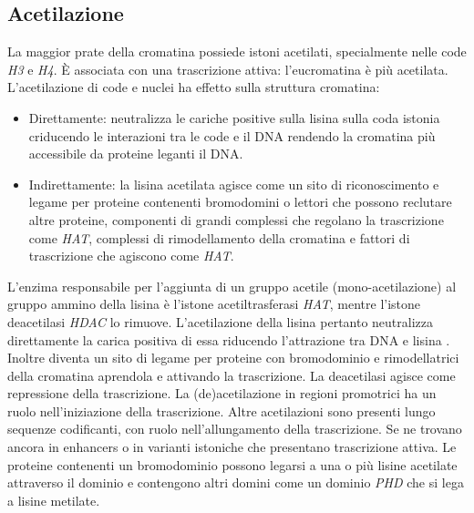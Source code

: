 \subsection{Acetilazione}
La maggior prate della cromatina possiede istoni acetilati, specialmente nelle code \emph{H3} e \emph{H4}. \`E associata con una trascrizione attiva: l'eucromatina \`e pi\`u acetilata.
L'acetilazione di code e nuclei ha effetto sulla struttura cromatina:
\begin{itemize}
	\item Direttamente: neutralizza le cariche positive sulla lisina sulla coda istonia criducendo le interazioni tra le code e il DNA rendendo la cromatina pi\`u accessibile da
		proteine leganti il DNA.
	\item Indirettamente: la lisina acetilata agisce come un sito di riconoscimento e legame per proteine contenenti bromodomini o lettori che possono reclutare altre proteine, 
		componenti di grandi complessi che regolano la trascrizione come \emph{HAT}, complessi di rimodellamento della cromatina e fattori di trascrizione che agiscono come
		\emph{HAT}.
\end{itemize}
L'enzima responsabile per l'aggiunta di un gruppo acetile (mono-acetilazione) al gruppo ammino  della lisina \`e l'istone acetiltrasferasi \emph{HAT}, mentre l'istone 
deacetilasi \emph{HDAC} lo rimuove. L'acetilazione della lisina pertanto neutralizza direttamente la carica positiva di essa riducendo l'attrazione tra DNA  e lisina .
Inoltre diventa un sito di legame per proteine con bromodominio e rimodellatrici della cromatina aprendola e attivando la trascrizione. La deacetilasi agisce come repressione della
trascrizione. La (de)acetilazione in regioni promotrici ha un ruolo nell'iniziazione della trascrizione. Altre acetilazioni sono presenti lungo sequenze codificanti, con ruolo 
nell'allungamento della trascrizione. Se ne trovano ancora in enhancers o in varianti istoniche che presentano trascrizione attiva. Le proteine contenenti un bromodominio possono 
legarsi a una o pi\`u lisine acetilate attraverso il dominio e contengono altri domini come un dominio \emph{PHD} che si lega a lisine metilate. 
